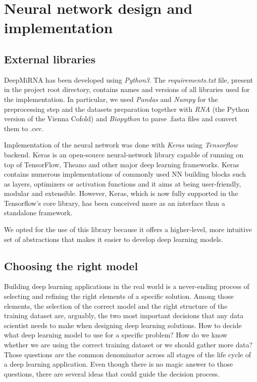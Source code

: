 
\chapter{Neural network design and implementation} %

\label{Chapter5} %

\section{External libraries}
DeepMiRNA has been developed using \emph{Python3}. The \emph{requirements.txt} file, present in the project root directory, contains names and versions of all libraries used for the implementation. In particular, we used \emph{Pandas} and \emph{Numpy} for the preprocessing step and the datasets preparation together with \emph{RNA} (the Python version of the Vienna Cofold) and \emph{Biopython} to parse .fasta files and convert them to .csv. 

Implementation of the neural network was done with \emph{Keras}\cite{keras} using \emph{Tensorflow} backend\cite{tensorflow}. Keras is an open-source neural-network library capable of running on top of TensorFlow, Theano and other major deep learning frameworks. Keras contains numerous implementations of commonly used NN building blocks such as layers, optimizers or activation functions and it aims at being user-friendly, modular and extensible. However, Keras, which is now fully supported in the Tensorflow's core library, has been conceived more as an interface than a standalone framework. 

We opted for the use of this library because it offers a higher-level, more intuitive set of abstractions that makes it easier to develop deep learning models.    

\section{Choosing the right model}
Building deep learning applications in the real world is a never-ending process of selecting and refining the right elements of a specific solution. Among those elements, the selection of the correct model and the right structure of the training dataset are, arguably, the two most important decisions that any data scientist needs to make when designing deep learning solutions. How to decide what deep learning model to use for a specific problem? How do we know whether we are using the correct training dataset or we should gather more data? Those questions are the common denominator across all stages of the life cycle of a deep learning application. Even though there is no magic answer to those questions, there are several ideas that could guide the decision process. 

